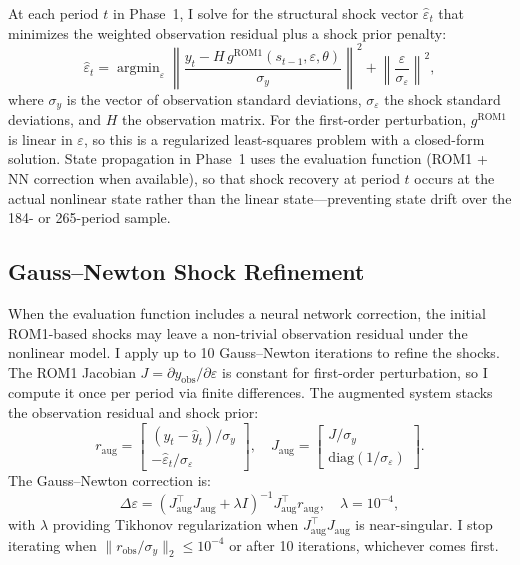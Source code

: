 \documentclass[12pt]{article}
\theoremstyle{plain}
\theoremstyle{definition}
\theoremstyle{remark}
\DeclareMathOperator{\argmin}{argmin}
\begin{document}
At each period $t$ in Phase~1, I solve for the structural shock vector $\hat{\varepsilon}_t$ that minimizes the weighted observation residual plus a shock prior penalty:
\begin{equation}
\hat{\varepsilon}_t = \argmin_\varepsilon \left\| \frac{y_t - H\, g^{\text{ROM1}}(s_{t-1}, \varepsilon, \theta)}{\sigma_y} \right\|^2 + \left\| \frac{\varepsilon}{\sigma_\varepsilon} \right\|^2,
\label{eq:inversion_objective}
\end{equation}
where $\sigma_y$ is the vector of observation standard deviations, $\sigma_\varepsilon$ the shock standard deviations, and $H$ the observation matrix. For the first-order perturbation, $g^{\text{ROM1}}$ is linear in $\varepsilon$, so this is a regularized least-squares problem with a closed-form solution. State propagation in Phase~1 uses the evaluation function (ROM1 + NN correction when available), so that shock recovery at period $t$ occurs at the actual nonlinear state rather than the linear state---preventing state drift over the 184- or 265-period sample.


\subsection{Gauss--Newton Shock Refinement}
\label{app:gauss_newton}

When the evaluation function includes a neural network correction, the initial ROM1-based shocks may leave a non-trivial observation residual under the nonlinear model. I apply up to 10 Gauss--Newton iterations to refine the shocks. The ROM1 Jacobian $J = \partial y_{\text{obs}} / \partial \varepsilon$ is constant for first-order perturbation, so I compute it once per period via finite differences. The augmented system stacks the observation residual and shock prior:
\begin{equation}
r_{\text{aug}} = \begin{bmatrix} (y_t - \hat{y}_t) / \sigma_y \\ -\hat{\varepsilon}_t / \sigma_\varepsilon \end{bmatrix}, \quad
J_{\text{aug}} = \begin{bmatrix} J / \sigma_y \\ \text{diag}(1/\sigma_\varepsilon) \end{bmatrix}.
\end{equation}
The Gauss--Newton correction is:
\begin{equation}
\Delta\varepsilon = (J_{\text{aug}}^\top J_{\text{aug}} + \lambda I)^{-1} J_{\text{aug}}^\top r_{\text{aug}}, \quad \lambda = 10^{-4},
\end{equation}
with $\lambda$ providing Tikhonov regularization when $J_{\text{aug}}^\top J_{\text{aug}}$ is near-singular. I stop iterating when $\|r_{\text{obs}} / \sigma_y\|_2 \leq 10^{-4}$ or after 10 iterations, whichever comes first.
\end{document}
